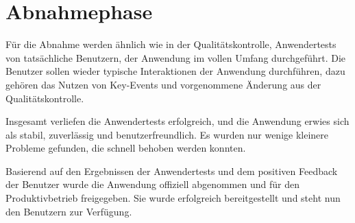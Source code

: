 \section{Abnahmephase} 
\label{sec:Abnahmephase}


Für die Abnahme werden ähnlich wie in der Qualitätskontrolle, Anwendertests von tatsächliche Benutzern, der Anwendung im vollen Umfang durchgeführt.
Die Benutzer sollen wieder typische Interaktionen der Anwendung durchführen, dazu gehören das Nutzen von Key-Events und vorgenommene Änderung aus der Qualitätskontrolle.


Insgesamt verliefen die Anwendertests erfolgreich, und die Anwendung erwies sich als stabil, zuverlässig und benutzerfreundlich.
Es wurden nur wenige kleinere Probleme gefunden, die schnell behoben werden konnten.

Basierend auf den Ergebnissen der Anwendertests und dem positiven Feedback der Benutzer wurde die Anwendung offiziell abgenommen und für den Produktivbetrieb freigegeben.
Sie wurde erfolgreich bereitgestellt und steht nun den Benutzern zur Verfügung.
